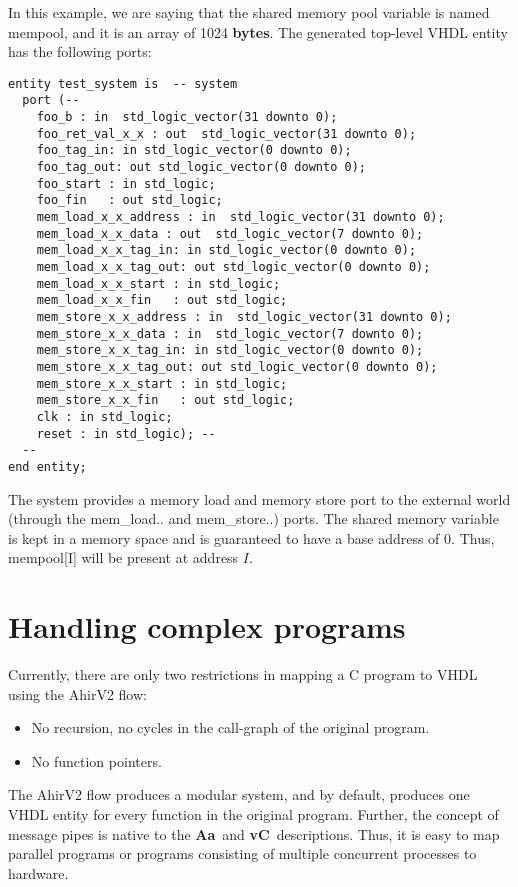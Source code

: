 \documentclass{article}
\newcommand{\Aa}{{\bf Aa}~}
\newcommand{\vC}{{\bf vC}~}
\begin{document}
In this example, we are saying that the shared memory pool
variable is named mempool, and it is an array of 1024 {\bf bytes}.
The generated top-level VHDL entity has the following
ports:
\begin{verbatim}
entity test_system is  -- system
  port (--
    foo_b : in  std_logic_vector(31 downto 0);
    foo_ret_val_x_x : out  std_logic_vector(31 downto 0);
    foo_tag_in: in std_logic_vector(0 downto 0);
    foo_tag_out: out std_logic_vector(0 downto 0);
    foo_start : in std_logic;
    foo_fin   : out std_logic;
    mem_load_x_x_address : in  std_logic_vector(31 downto 0);
    mem_load_x_x_data : out  std_logic_vector(7 downto 0);
    mem_load_x_x_tag_in: in std_logic_vector(0 downto 0);
    mem_load_x_x_tag_out: out std_logic_vector(0 downto 0);
    mem_load_x_x_start : in std_logic;
    mem_load_x_x_fin   : out std_logic;
    mem_store_x_x_address : in  std_logic_vector(31 downto 0);
    mem_store_x_x_data : in  std_logic_vector(7 downto 0);
    mem_store_x_x_tag_in: in std_logic_vector(0 downto 0);
    mem_store_x_x_tag_out: out std_logic_vector(0 downto 0);
    mem_store_x_x_start : in std_logic;
    mem_store_x_x_fin   : out std_logic;
    clk : in std_logic;
    reset : in std_logic); --
  --
end entity;
\end{verbatim}

The system provides a memory load and memory store
port to the external world (through the mem\_load.. and mem\_store..)
ports.  The shared memory variable is kept in a memory
space and is guaranteed to have a base address of $0$.  Thus,
mempool[I] will be present at address $I$.

\section{Handling complex programs}

Currently, there are only two restrictions in mapping
a C program to VHDL using the AhirV2 flow:
\begin{itemize}
\item No recursion, no cycles in the call-graph of the original
program.
\item No function pointers.
\end{itemize}

The AhirV2 flow produces a modular system, and by default,
produces one VHDL entity for every function in the original
program.  Further, the concept of message pipes is native
to the \Aa and \vC descriptions.  Thus, it is easy to
map parallel programs or programs consisting of multiple
concurrent processes to hardware.
\end{document}
